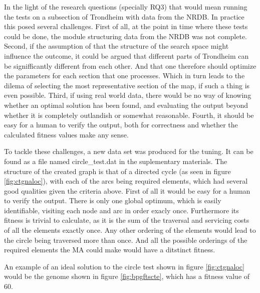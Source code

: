 In the light of the research questions (specially RQ3) that would mean running the tests on a subsection of Trondheim with data from the NRDB. In practice this posed several challenges. First of all, at the point in time where these tests could be done, the module structuring data from the NRDB was not complete. Second, if the assumption of that the structure of the search space might influence the outcome, it could be argued that different parts of Trondheim can be signifficantly different from each other. And that one therefore should optimize the parameters for each section that one processes. Which in turn leads to the dilema of selecting the most representative section of the map, if such a thing is even possible. Third, if using real world data, there would be no way of knowing whether an optimal solution has been found, and evaluating the output beyond whether it is completely outlandish or somewhat reasonable. Fourth, it should be easy for a human to verify the output, both for correctness and whether the calculated fitness values make any sense.

To tackle these challenges, a new data set was produced for the tuning. It can be found as a file named circle\_test.dat in the suplementary materials. The structure of the created graph is that of a directed cycle (as seen in figure \ref{fig:ctgnaloc}), with each of the arcs being required elements, which had several good qualities given the criteria above. First of all it would be easy for a human to verify the output. There is only one global optimum, which is easily identifiable, visiting each node and arc in order exacly once. Furthermore its fitness is trivial to calculate, as it is the sum of the traversal and servicing costs of all the elements exactly once. Any other ordering of the elements would lead to the circle being traversed more than once. And all the possible orderings of the required elements the MA could make would have a ditstinct fitness.

An example of an ideal solution to the circle test shown in figure \ref{fig:ctgnaloc} would be the genome shown in figure \ref{fig:bpgftscte}, which has a fitness value of 60.

